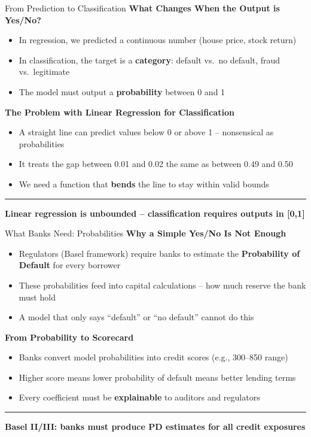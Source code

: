 \documentclass[8pt,aspectratio=169]{beamer}
\newcommand{\bottomnote}[1]{%
\vfill
\vspace{-2mm}
\textcolor{mllavender2}{\rule{\textwidth}{0.4pt}}
\vspace{1mm}
\footnotesize
\textbf{#1}
}
\begin{document}
\begin{frame}[t]{From Prediction to Classification}
\textbf{What Changes When the Output is Yes/No?}
\begin{itemize}
  \item In regression, we predicted a continuous number (house price, stock return)
  \item In classification, the target is a \textbf{category}: default vs.\ no default, fraud vs.\ legitimate
  \item The model must output a \textbf{probability} between 0 and 1
\end{itemize}

\vspace{0.8em}
\textbf{The Problem with Linear Regression for Classification}
\begin{itemize}
  \item A straight line can predict values below 0 or above 1 -- nonsensical as probabilities
  \item It treats the gap between 0.01 and 0.02 the same as between 0.49 and 0.50
  \item We need a function that \textbf{bends} the line to stay within valid bounds
\end{itemize}
\bottomnote{Linear regression is unbounded -- classification requires outputs in [0,1]}
\end{frame}

\begin{frame}[t]{What Banks Need: Probabilities}
\textbf{Why a Simple Yes/No Is Not Enough}
\begin{itemize}
  \item Regulators (Basel framework) require banks to estimate the \textbf{Probability of Default} for every borrower
  \item These probabilities feed into capital calculations -- how much reserve the bank must hold
  \item A model that only says ``default'' or ``no default'' cannot do this
\end{itemize}

\vspace{0.8em}
\textbf{From Probability to Scorecard}
\begin{itemize}
  \item Banks convert model probabilities into credit scores (e.g., 300--850 range)
  \item Higher score means lower probability of default means better lending terms
  \item Every coefficient must be \textbf{explainable} to auditors and regulators
\end{itemize}
\bottomnote{Basel II/III: banks must produce PD estimates for all credit exposures}
\end{frame}
\end{document}
